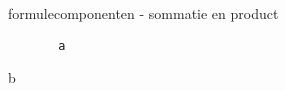 \begin{frame}[fragile]{formulecomponenten - sommatie en product}
    \begin{verbatim}
       a
    \end{verbatim}
    \begin{tcolorbox}[width=11cm, size=small]
        b
    \end{tcolorbox}

\end{frame}